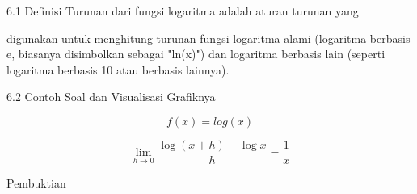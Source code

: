 \documentclass[a4paper,10pt]{article}
\begin{document}
\begin{eulernotebook}
\begin{eulercomment}
\begin{eulercomment}
\begin{eulercomment}
\begin{eulercomment}
\begin{eulercomment}
\begin{eulercomment}
\begin{eulercomment}
\begin{eulercomment}
\begin{eulercomment}
\begin{eulercomment}
\begin{eulercomment}
\begin{eulercomment}
\begin{eulercomment}
\begin{eulercomment}
\begin{eulercomment}
\begin{eulercomment}
\begin{eulercomment}
\begin{eulercomment}
\begin{eulercomment}
\begin{eulercomment}
\begin{eulercomment}
\end{eulercomment}
\begin{eulerttcomment}
     6.1 Definisi
         Turunan dari fungsi logaritma adalah aturan turunan yang
\end{eulerttcomment}
\begin{eulercomment}
digunakan untuk menghitung turunan fungsi logaritma alami (logaritma
berbasis e, biasanya disimbolkan sebagai "ln(x)") dan logaritma
berbasis lain (seperti logaritma berbasis 10 atau berbasis lainnya).

\end{eulercomment}
\begin{eulerttcomment}
     6.2 Contoh Soal dan Visualisasi Grafiknya
\end{eulerttcomment}
\begin{eulercomment}

\end{eulercomment}
\begin{eulerformula}
\[
f(x) = log(x)
\]
\end{eulerformula}
\begin{eulerformula}
\[
\lim_{h\rightarrow 0}{\frac{\log \left(x+h\right)-\log x}{h}}=  \frac{1}{x}
\]
\end{eulerformula}
\begin{eulercomment}
Pembuktian


\end{eulercomment}
\end{eulercomment}
\end{eulercomment}
\end{eulercomment}
\end{eulercomment}
\end{eulercomment}
\end{eulercomment}
\end{eulercomment}
\end{eulercomment}
\end{eulercomment}
\end{eulercomment}
\end{eulercomment}
\end{eulercomment}
\end{eulercomment}
\end{eulercomment}
\end{eulercomment}
\end{eulercomment}
\end{eulercomment}
\end{eulercomment}
\end{eulercomment}
\end{eulercomment}
\end{eulernotebook}
\end{document}

